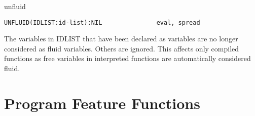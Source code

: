 \begin{Function}{unfluid}
\begin{verbatim}
UNFLUID(IDLIST:id-list):NIL               eval, spread
\end{verbatim}
   The  variables  in IDLIST  that  have been  declared  as 
   variables   are  no  longer  considered  as  fluid  variables.
   Others  are  ignored.   This  affects only  compiled functions
   as  free variables in  interpreted functions are automatically
   considered fluid.

\end{Function}



\section{Program Feature Functions}


